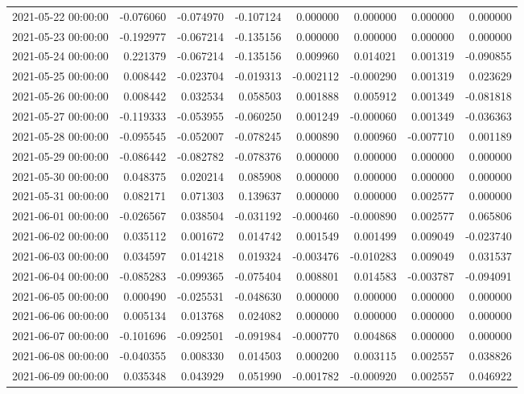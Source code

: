 \begin{tabular}{lrrrrrrr}
2021-05-22 00:00:00 & -0.076060 & -0.074970 & -0.107124 & 0.000000 & 0.000000 & 0.000000 & 0.000000 \\
2021-05-23 00:00:00 & -0.192977 & -0.067214 & -0.135156 & 0.000000 & 0.000000 & 0.000000 & 0.000000 \\
2021-05-24 00:00:00 & 0.221379 & -0.067214 & -0.135156 & 0.009960 & 0.014021 & 0.001319 & -0.090855 \\
2021-05-25 00:00:00 & 0.008442 & -0.023704 & -0.019313 & -0.002112 & -0.000290 & 0.001319 & 0.023629 \\
2021-05-26 00:00:00 & 0.008442 & 0.032534 & 0.058503 & 0.001888 & 0.005912 & 0.001349 & -0.081818 \\
2021-05-27 00:00:00 & -0.119333 & -0.053955 & -0.060250 & 0.001249 & -0.000060 & 0.001349 & -0.036363 \\
2021-05-28 00:00:00 & -0.095545 & -0.052007 & -0.078245 & 0.000890 & 0.000960 & -0.007710 & 0.001189 \\
2021-05-29 00:00:00 & -0.086442 & -0.082782 & -0.078376 & 0.000000 & 0.000000 & 0.000000 & 0.000000 \\
2021-05-30 00:00:00 & 0.048375 & 0.020214 & 0.085908 & 0.000000 & 0.000000 & 0.000000 & 0.000000 \\
2021-05-31 00:00:00 & 0.082171 & 0.071303 & 0.139637 & 0.000000 & 0.000000 & 0.002577 & 0.000000 \\
2021-06-01 00:00:00 & -0.026567 & 0.038504 & -0.031192 & -0.000460 & -0.000890 & 0.002577 & 0.065806 \\
2021-06-02 00:00:00 & 0.035112 & 0.001672 & 0.014742 & 0.001549 & 0.001499 & 0.009049 & -0.023740 \\
2021-06-03 00:00:00 & 0.034597 & 0.014218 & 0.019324 & -0.003476 & -0.010283 & 0.009049 & 0.031537 \\
2021-06-04 00:00:00 & -0.085283 & -0.099365 & -0.075404 & 0.008801 & 0.014583 & -0.003787 & -0.094091 \\
2021-06-05 00:00:00 & 0.000490 & -0.025531 & -0.048630 & 0.000000 & 0.000000 & 0.000000 & 0.000000 \\
2021-06-06 00:00:00 & 0.005134 & 0.013768 & 0.024082 & 0.000000 & 0.000000 & 0.000000 & 0.000000 \\
2021-06-07 00:00:00 & -0.101696 & -0.092501 & -0.091984 & -0.000770 & 0.004868 & 0.000000 & 0.000000 \\
2021-06-08 00:00:00 & -0.040355 & 0.008330 & 0.014503 & 0.000200 & 0.003115 & 0.002557 & 0.038826 \\
2021-06-09 00:00:00 & 0.035348 & 0.043929 & 0.051990 & -0.001782 & -0.000920 & 0.002557 & 0.046922 \\

\end{tabular}
